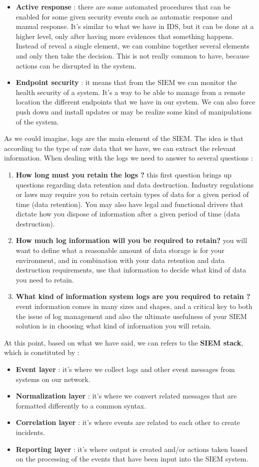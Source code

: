 \documentclass[11pt]{article}
\begin{document}
\begin{itemize}
\item \textbf{Active response} : there are some automated procedures that can be enabled for some given security events such as automatic response and manual response. It's similar to what we have in IDS, but it can be done at a higher level, only after having more evidences that something happens. Instead of reveal a single element, we can combine together several elements and only then take the decision. This is not really common to have, because actions can be disrupted in the system.
\item \textbf{Endpoint security} : it means that from the SIEM we can monitor the health security of a system. It's a way to be able to manage from a remote location the different endpoints that we have in our system. We can also force push down and install updates or may be realize some kind of manipulations of the system.
\end{itemize}
As we could imagine, logs are the main element of the SIEM. The idea is that according to the type of raw data that we have, we can extract the relevant information. When dealing with the logs we need to answer to several questions : 
\begin{enumerate}
\item \textbf{How long must you retain the logs ?} this first question brings up questions regarding data retention and data destruction. Industry regulations or laws may require you to retain certain types of data for a given period of time (data retention). You may also have legal and functional drivers that dictate how you dispose of information after a given period of time (data destruction).
\item \textbf{How much log information will you be required to retain?} you will want to define what a reasonable amount of data storage is for your environment, and in combination with your data retention and data destruction requirements, use that information to decide what kind of data you need to retain.
\item \textbf{What kind of information system logs are you required to retain ?} event information comes in many sizes and shapes, and a critical key to both the issue of log management and also the ultimate usefulness of your SIEM solution is in choosing what kind of information you will retain.
\end{enumerate}
At this point, based on what we have said, we can refers to the \textbf{SIEM stack}, which is constituted by :
\begin{itemize}
\item \textbf{Event layer} : it's where we collect logs and other event messages from systems on our network.
\item \textbf{Normalization layer} : it's where we convert related messages that are formatted differently to a common syntax.
\item \textbf{Correlation layer} : it's where events are related to each other to create incidents.
\item \textbf{Reporting layer} : it's where output is created and/or actions taken based on the processing of the events that have been input into the SIEM system.
\end{itemize}
\end{document}
